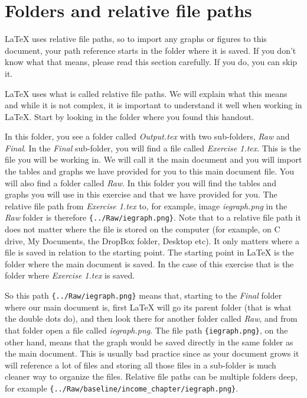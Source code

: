 \documentclass[12pts]{article}
\begin{document}
	\section{Folders and relative file paths}
	
	\begin{tcolorbox}[colback=white,colframe=orange,title=\textbf{Read first}]
			{\LaTeX} uses relative file paths, so to import any graphs or figures to this document, your path reference starts in the folder where it is saved. If you don't know what that means, please read this section carefully. If you do, you can skip it.
	\end{tcolorbox}
	
	{\LaTeX} uses what is called relative file paths. We will explain what this means and while it is not complex, it is important to understand it well when working in {\LaTeX}. Start by looking in the folder where you found this handout. 
	
	In this folder, you see a folder called \emph{Output.tex} with two sub-folders, \emph{Raw} and \emph{Final}. In the \emph{Final} sub-folder, you will find a file called \emph{Exercise 1.tex}. This is the file you will be working in. We will call it the main document and you will import the tables and graphs we have provided for you to this main document file. You will also find a folder called \emph{Raw}. In this folder you will find the tables and graphs you will use in this exercise and that we have provided for you. The relative file path from \emph{Exercise 1.tex} to, for example, image \emph{iegraph.png} in the \emph{Raw} folder is therefore \verb|{../Raw/iegraph.png}|. Note that to a relative file path it does not matter where the file is stored on the computer (for example, on C drive, My Documents, the DropBox folder, Desktop etc). It only matters where a file is saved in relation to the starting point. The starting point in {\LaTeX} is the folder where the main document is saved. In the case of this exercise that is the folder where \emph{Exercise 1.tex} is saved.
	
	So this path \verb|{../Raw/iegraph.png}| means that, starting to the \emph{Final} folder where our main document is, first {\LaTeX} will go its parent folder (that is what the double dots do), and then look there for another folder called \emph{Raw}, and from that folder open a file called \emph{iegraph.png}. The file path \verb|{iegraph.png}|, on the other hand, means that the graph would be saved directly in the same folder as the main document. This is usually bad practice since as your document grows it will reference a lot of files and storing all those files in a sub-folder is much cleaner way to organize the files. Relative file paths can be multiple folders deep, for example \verb|{../Raw/baseline/income_chapter/iegraph.png}|. 
	
\end{document}
